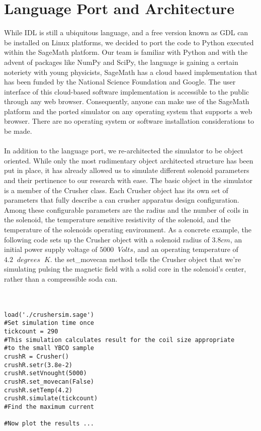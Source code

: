 \documentclass[prb,preprint]{revtex4-1}
\begin{document}
\section{Language Port and Architecture}
While IDL is still a ubiquitous language, and a free version known as GDL can be installed on Linux platforms, we decided to port the code to Python executed within the SageMath platform.  Our team is familiar with Python and with the advent of packages like NumPy and SciPy, the language is gaining a certain noteriety with young physicists, SageMath has a cloud based implementation that has been funded by the National Science Foundation and Google. The user interface of this cloud-based software implementation is accessible to the public through any web browser.  Consequently, anyone can make use of the SageMath platform and the ported simulator on any operating system that supports a web browser.  There are no operating system or software installation considerations to be made.
\\
\\
In addition to the language port, we re-architected the simulator to be object oriented.  While only the most rudimentary object architected structure has been put in place, it has already allowed us to simulate different solenoid parameters and their pertinence to our research with ease.  The basic object in the simulator is a member of the Crusher class.  Each Crusher object has its own set of parameters that fully describe a can crusher apparatus design configuration.  Among these configurable parameters  are the radius and the number of coils in the solenoid, the temperature sensitive resistivity of the solenoid, and the temperature of the solenoids operating environment.  As a concrete example, the following code sets up the Crusher object with a solenoid radius of $3.8 cm$, an initial power supply voltage of $5000\;\;Volts$, and an operating temperature of $4.2\;\;degrees\;\;K$.  the set\_movecan method tells the Crusher object that we're simulating pulsing the magnetic field with a solid core in the solenoid's center, rather than a compressible soda can.
\\\\\\
\lstset{language=Python}
\begin{lstlisting}[frame=single]
load('./crushersim.sage')
#Set simulation time once
tickcount = 290
#This simulation calculates result for the coil size appropriate
#to the small YBCO sample
crushR = Crusher()
crushR.setr(3.8e-2)
crushR.setVnought(5000)
crushR.set_movecan(False)
crushR.setTemp(4.2)
crushR.simulate(tickcount)
#Find the maximum current

#Now plot the results ...
\end{lstlisting}
\end{document}
